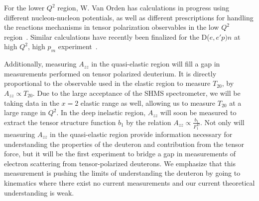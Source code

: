 For the lower $Q^2$ region, W. Van Orden has calculations in progress using different nucleon-nucleon potentials, as well as different prescriptions for handling the reactions mechanisms in tensor polarization observables in the low $Q^2$ region~\cite{vanorden-convo}. Similar calculations have recently been finalized for the D($e,e'p)n$ at high $Q^2$, high $p_m$ experiment~\cite{Ford:2014yua}. 

Additionally, measuring $A_{zz}$ in the quasi-elastic region will fill a gap in measurements performed on tensor polarized deuterium. It is directly proportional to the observable used in the elastic region to measure $T_{20}$, 
by $A_{zz} \propto T_{20}$. Due to the large acceptance of the SHMS spectrometer, we will be taking data in the $x = 2$ elastic range as well, allowing us to measure $T_{20}$ at a large range in $Q^2$. In the deep inelastic region, $A_{zz}$ will soon be measured to extract the tensor structure function $b_1$ by the relation $A_{zz} \propto \frac{b_1}{F_1^D}$. Not only will measuring $A_{zz}$ in the quasi-elastic region provide information necessary for understanding the properties of the deuteron and contribution from the tensor force, but it will be the first experiment to bridge a gap in measurements of electron scattering from tensor-polarized deuterons. We emphasize that this measurement is pushing the limits of understanding the deuteron by going to kinematics where there exist no current measurements and our current theoretical understanding is weak.



